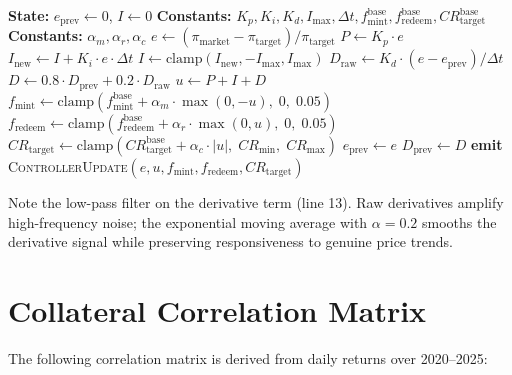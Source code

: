 \documentclass[11pt,a4paper]{article}
\newcommand{\CR}{\mathit{CR}}
\begin{document}
\begin{algorithm}[H]
\caption{Discrete PID Controller (On-Chain)}
\label{alg:pid_onchain}
\begin{algorithmic}[1]
\State \textbf{State:} $e_{\text{prev}} \gets 0$, $I \gets 0$
\State \textbf{Constants:} $K_p, K_i, K_d, I_{\max}, \Delta t, f_{\text{mint}}^{\text{base}}, f_{\text{redeem}}^{\text{base}}, \CR_{\text{target}}^{\text{base}}$
\State \textbf{Constants:} $\alpha_m, \alpha_r, \alpha_c$
\Statex
{}
  \State $e \gets (\pi_{\text{market}} - \pi_{\text{target}}) / \pi_{\text{target}}$
  \Statex
  \State $P \gets K_p \cdot e$
  \Statex
  \State $I_{\text{new}} \gets I + K_i \cdot e \cdot \Delta t$
  \State $I \gets \text{clamp}(I_{\text{new}}, -I_{\max}, I_{\max})$
  \Statex
  \State $D_{\text{raw}} \gets K_d \cdot (e - e_{\text{prev}}) / \Delta t$
  \State $D \gets 0.8 \cdot D_{\text{prev}} + 0.2 \cdot D_{\text{raw}}$ 
  \Statex
  \State $u \gets P + I + D$
  \Statex
  \State $f_{\text{mint}} \gets \text{clamp}(f_{\text{mint}}^{\text{base}} + \alpha_m \cdot \max(0, -u),\; 0,\; 0.05)$
  \State $f_{\text{redeem}} \gets \text{clamp}(f_{\text{redeem}}^{\text{base}} + \alpha_r \cdot \max(0, u),\; 0,\; 0.05)$
  \State $\CR_{\text{target}} \gets \text{clamp}(\CR_{\text{target}}^{\text{base}} + \alpha_c \cdot |u|,\; \CR_{\min},\; \CR_{\max})$
  \Statex
  \State $e_{\text{prev}} \gets e$
  \State $D_{\text{prev}} \gets D$
  \Statex
  \State \textbf{emit} \textsc{ControllerUpdate}$(e, u, f_{\text{mint}}, f_{\text{redeem}}, \CR_{\text{target}})$
\EndProcedure
\end{algorithmic}
\end{algorithm}

Note the low-pass filter on the derivative term (line 13).
Raw derivatives amplify high-frequency noise; the exponential moving average with $\alpha = 0.2$ smooths the derivative signal while preserving responsiveness to genuine price trends.

\section{Collateral Correlation Matrix}
\label{app:correlation}

The following correlation matrix is derived from daily returns over 2020--2025:
\end{document}

